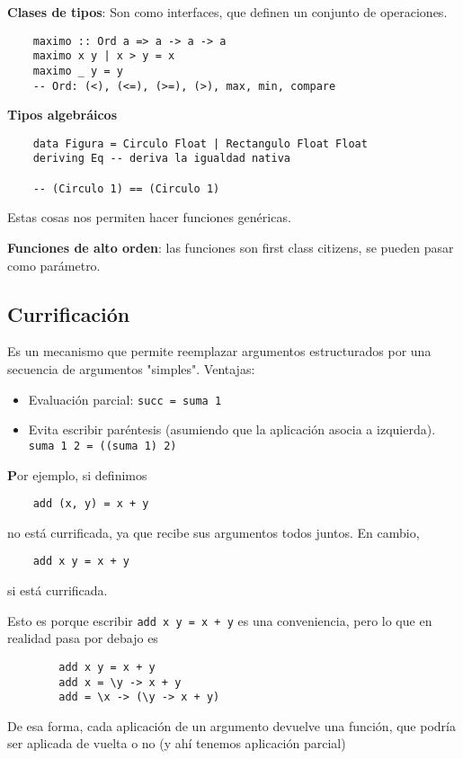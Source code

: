 \documentclass{report}
\theoremstyle{definition} %
\newenvironment{nota}[1]
    {\begin{leftbar}\textbf{#1}}
    {\end{leftbar}}
\begin{document}
\textbf{Clases de tipos}: Son como interfaces, que definen un conjunto de
operaciones.

\begin{verbatim}
    maximo :: Ord a => a -> a -> a
    maximo x y | x > y = x
    maximo _ y = y
    -- Ord: (<), (<=), (>=), (>), max, min, compare
\end{verbatim}

\textbf{Tipos algebráicos}

\begin{verbatim}
    data Figura = Circulo Float | Rectangulo Float Float
    deriving Eq -- deriva la igualdad nativa

    -- (Circulo 1) == (Circulo 1)
\end{verbatim}

Estas cosas nos permiten hacer funciones genéricas.

\textbf{Funciones de alto orden}: las funciones son first class citizens, se
pueden pasar como parámetro.

\subsection{Currificación}

Es un mecanismo que permite reemplazar argumentos estructurados por una
secuencia de argumentos "simples". Ventajas:

\begin{itemize}
    \item Evaluación parcial: \texttt{succ = suma 1}
    \item Evita escribir paréntesis (asumiendo que la aplicación asocia a
    izquierda). \texttt{suma 1 2 = ((suma 1) 2)}
\end{itemize}

\begin{nota}
    Por ejemplo, si definimos
    \begin{verbatim}
    add (x, y) = x + y
    \end{verbatim}
    no está currificada, ya que recibe sus argumentos todos juntos. En cambio,
    \begin{verbatim}
    add x y = x + y
    \end{verbatim}
    si está currificada.

    Esto es porque escribir \texttt{add x y = x + y} es una conveniencia, pero 
    lo que en realidad pasa por debajo es
    
    \begin{verbatim}
        add x y = x + y
        add x = \y -> x + y
        add = \x -> (\y -> x + y)
    \end{verbatim}

    De esa forma, cada aplicación de un argumento devuelve una función, que
    podría ser aplicada de vuelta o no (y ahí tenemos aplicación parcial)
\end{nota}
\end{document}

